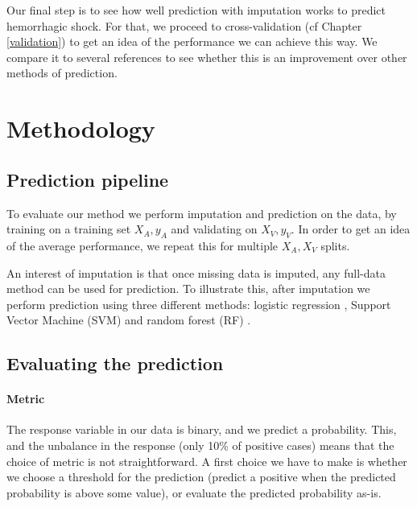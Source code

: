 

Our final step is to see how well prediction with imputation works to predict hemorrhagic shock. For that, we proceed to cross-validation (cf Chapter \ref{validation}) to get an idea of the performance we can achieve this way. We compare it to several references to see whether this is an improvement over other methods of prediction.
	\section{Methodology}
		\subsection{Prediction pipeline}
To evaluate our method we perform imputation and prediction on the data, by training on a training set $X_A, y_A$ and validating on $X_V, y_V$. In order to get an idea of the average performance, we repeat this for multiple $X_A, X_V$ splits.

An interest of imputation is that once missing data is imputed, any full-data method can be used for prediction. To illustrate this, after imputation we perform prediction using three different methods: logistic regression \cite{hosmer2013logreg}, Support Vector Machine (SVM) \cite{hearst1998SVM} and random forest (RF) \cite{svetnik2003RF}. 

		\subsection{Evaluating the prediction}
\paragraph{Metric}
The response variable in our data is binary, and we predict a probability. This, and the unbalance in the response (only 10\% of positive cases) means that the choice of metric is not straightforward. A first choice we have to make is whether we choose a threshold for the prediction (predict a positive when the predicted probability is above some value), or evaluate the predicted probability as-is.

